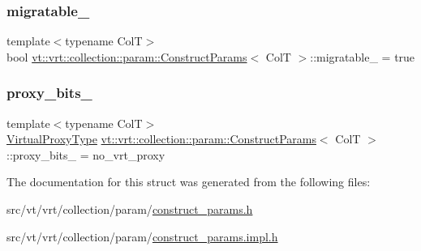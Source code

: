 \mbox{\label{structvt_1_1vrt_1_1collection_1_1param_1_1_construct_params_a811d67f8d46e6b6ad2736bba81201354}} 
\subsubsection{\texorpdfstring{migratable\+\_\+}{migratable\_}}
{\footnotesize\ttfamily template$<$typename ColT$>$ \\
bool \hyperlink{structvt_1_1vrt_1_1collection_1_1param_1_1_construct_params}{vt\+::vrt\+::collection\+::param\+::\+Construct\+Params}$<$ ColT $>$\+::migratable\+\_\+ = true\hspace{0.3cm}{\ttfamily [private]}}

\mbox{\label{structvt_1_1vrt_1_1collection_1_1param_1_1_construct_params_a459e1541fd22e637a616ca1f1f899124}} 
\subsubsection{\texorpdfstring{proxy\+\_\+bits\+\_\+}{proxy\_bits\_}}
{\footnotesize\ttfamily template$<$typename ColT$>$ \\
\hyperlink{namespacevt_a1b417dd5d684f045bb58a0ede70045ac}{Virtual\+Proxy\+Type} \hyperlink{structvt_1_1vrt_1_1collection_1_1param_1_1_construct_params}{vt\+::vrt\+::collection\+::param\+::\+Construct\+Params}$<$ ColT $>$\+::proxy\+\_\+bits\+\_\+ = no\+\_\+vrt\+\_\+proxy\hspace{0.3cm}{\ttfamily [private]}}



The documentation for this struct was generated from the following files\+:\begin{DoxyCompactItemize}
\item 
src/vt/vrt/collection/param/\hyperlink{construct__params_8h}{construct\+\_\+params.\+h}\item 
src/vt/vrt/collection/param/\hyperlink{construct__params_8impl_8h}{construct\+\_\+params.\+impl.\+h}\end{DoxyCompactItemize}
